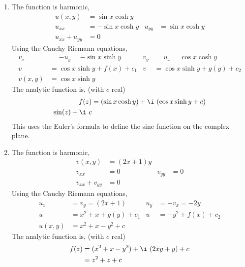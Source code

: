 \begin{enumerate}
    \item The function is \textcolor{y_h}{harmonic},
          \begin{align}
              u(x, y)         & = \sin x \cosh y    \\
              u_{xx}          & = -\sin x \cosh y &
              u_{yy}          & = \sin x \cosh y    \\
              u_{xx} + u_{yy} & = 0
          \end{align}
          Using the Cauchy Riemann equations,
          \begin{align}
              v_x     & = -u_y = -\sin x \sinh y      &
              v_y     & = u_x = \cos x \cosh y          \\
              v       & = \cos x \sinh y + f(x) + c_1 &
              v       & = \cos x \sinh y + g(y) + c_2   \\
              v(x, y) & = \cos x \sinh y
          \end{align}
          The analytic function is, (with $ c $ real)
          \begin{align}
              f(z) & = (\sin x \cosh y) + \i\ (\cos x \sinh y + c) \\
              \sin(z) + \i\ c
          \end{align}
          This uses the Euler's formula to define the sine function on the complex
          plane.

    \item The function is \textcolor{y_h}{harmonic},
          \begin{align}
              v(x, y)         & = (2x + 1)y   \\
              v_{xx}          & = 0         &
              v_{yy}          & = 0           \\
              v_{xx} + v_{yy} & = 0
          \end{align}
          Using the Cauchy Riemann equations,
          \begin{align}
              u_x     & = v_y = (2x + 1)       &
              u_y     & = -v_x = -2y             \\
              u       & = x^2 + x + g(y) + c_1 &
              u       & = -y^2 + f(x) + c_2      \\
              u(x, y) & = x^2 + x - y^2 + c
          \end{align}
          The analytic function is, (with $ c $ real)
          \begin{align}
              f(z) & = (x^2 + x - y^2) + \i\ (2xy + y) + c \\
                   & = z^2 + z + c
          \end{align}


\end{enumerate}
